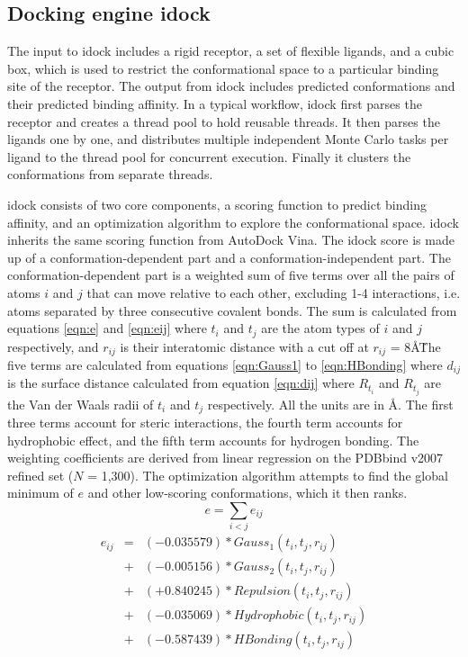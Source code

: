 \documentclass[10pt]{article}
\begin{document}
\subsection*{Docking engine idock}
The input to idock includes a rigid receptor, a set of flexible ligands, and a cubic box, which is used to restrict the conformational space to a particular binding site of the receptor. The output from idock includes predicted conformations and their predicted binding affinity. In a typical workflow, idock first parses the receptor and creates a thread pool to hold reusable threads. It then parses the ligands one by one, and distributes multiple independent Monte Carlo tasks per ligand to the thread pool for concurrent execution. Finally it clusters the conformations from separate threads.

idock consists of two core components, a scoring function to predict binding affinity, and an optimization algorithm to explore the conformational space. idock inherits the same scoring function from AutoDock Vina. The idock score is made up of a conformation-dependent part and a conformation-independent part. The conformation-dependent part is a weighted sum of five terms over all the pairs of atoms $i$ and $j$ that can move relative to each other, excluding 1-4 interactions, i.e. atoms separated by three consecutive covalent bonds. The sum is calculated from equations \eqref{eqn:e} and \eqref{eqn:eij} where $t_i$ and $t_j$ are the atom types of $i$ and $j$ respectively, and $r_{ij}$ is their interatomic distance with a cut off at $r_{ij}$ = 8\AA\. The five terms are calculated from equations \eqref{eqn:Gauss1} to \eqref{eqn:HBonding} where $d_{ij}$ is the surface distance calculated from equation \eqref{eqn:dij} where $R_{t_i}$ and $R_{t_j}$ are the Van der Waals radii of $t_i$ and $t_j$ respectively. All the units are in \AA. The first three terms account for steric interactions, the fourth term accounts for hydrophobic effect, and the fifth term accounts for hydrogen bonding. The weighting coefficients are derived from linear regression on the PDBbind \cite{529,530} v2007 refined set ($N$ = 1,300). The optimization algorithm attempts to find the global minimum of $e$ and other low-scoring conformations, which it then ranks.
\begin{equation}
\label{eqn:e}
e = \sum_{i < j} e_{ij}
\end{equation}
\begin{eqnarray}
\label{eqn:eij}
e_{ij} &=& (-0.035579) * Gauss_1(t_i, t_j, r_{ij}) \nonumber \\
       &+& (-0.005156) * Gauss_2(t_i, t_j, r_{ij}) \nonumber \\
       &+& (+0.840245) * Repulsion(t_i, t_j, r_{ij}) \nonumber \\
       &+& (-0.035069) * Hydrophobic(t_i, t_j, r_{ij}) \nonumber \\
       &+& (-0.587439) * HBonding(t_i, t_j, r_{ij})
\end{eqnarray}
\end{document}
